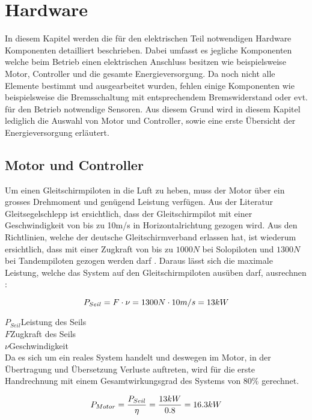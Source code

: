 \section{Hardware}\label{sec:Hardware}
In diesem Kapitel werden die für den elektrischen Teil notwendigen Hardware Komponenten detailliert beschrieben. Dabei umfasst es jegliche Komponenten welche beim Betrieb einen elektrischen Anschluss besitzen wie beispielsweise Motor, Controller und die gesamte Energieversorgung. Da noch nicht alle Elemente bestimmt und ausgearbeitet wurden, fehlen einige Komponenten wie beispielsweise die Bremsschaltung mit entsprechendem Bremswiderstand oder evt. für den Betrieb notwendige Sensoren. Aus diesem Grund wird in diesem Kapitel lediglich die Auswahl von Motor und Controller, sowie eine erste Übersicht der Energieversorgung erläutert.


\subsection{Motor und Controller}\label{subsec:MotorController}
Um einen Gleitschirmpiloten in die Luft zu heben, muss der Motor über ein grosses Drehmoment und genügend Leistung verfügen. Aus der Literatur Gleitsegelschlepp \cite{Gleitsegelschlepp} ist ersichtlich, dass der Gleitschirmpilot mit einer Geschwindigkeit von bis zu 10m/s in Horizontalrichtung gezogen wird. Aus den Richtlinien, welche der deutsche Gleitschirmverband erlassen hat, ist wiederum ersichtlich, dass mit einer Zugkraft von bis zu $ 1000N $ bei Solopiloten und $ 1300N $ bei Tandempiloten gezogen werden darf \cite{WindenProtokoll}. Daraus lässt sich die maximale Leistung, welche das System auf den Gleitschirmpiloten ausüben darf, ausrechnen \cite{Kuchling}:


\begin{equation}
\centering
	P_{Seil}=F \cdot \nu=1300N \cdot 10m/s=13kW
\label{eq:LeistungSeil}
\end{equation}

$ P_{Seil} $\quad 	Leistung des Seils     \\
$ F $\qquad  Zugkraft des Seils    \\
$ \nu $\qquad  Geschwindigkeit     \\

Da es sich um ein reales System handelt und deswegen im Motor, in der Übertragung und Übersetzung Verluste auftreten, wird für die erste Handrechnung mit einem Gesamtwirkungsgrad des Systems von $80\%$ gerechnet.

\begin{equation}
\centering
	P_{Motor}=\frac{P_{Seil}}{\eta}=\frac{13kW}{0.8}=16.3kW
\label{eq:LeistungMotor}
\end{equation}

